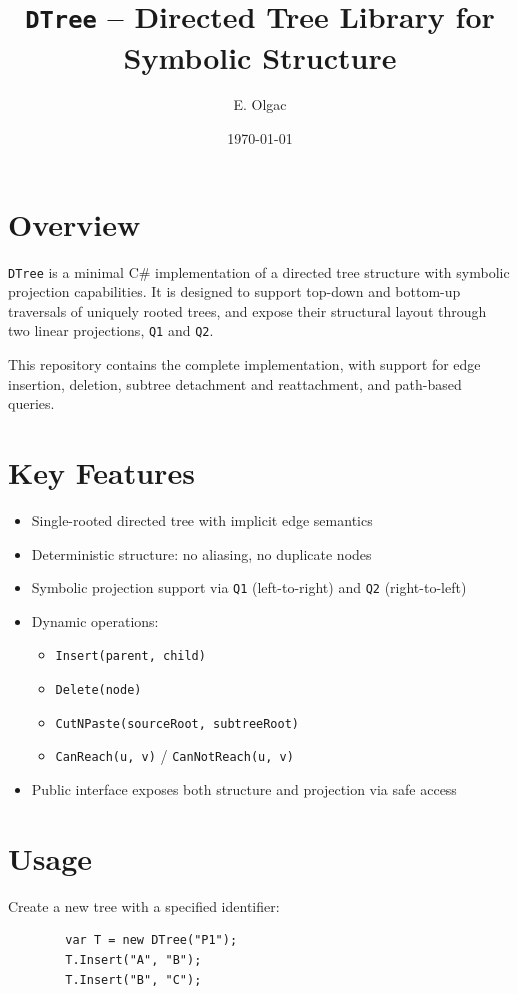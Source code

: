 \documentclass[11pt]{article}
\title{\texttt{DTree} -- Directed Tree Library for Symbolic Structure}
\author{E. Olgac}
\date{\today}
\begin{document}
	
	\maketitle
	
	\section*{Overview}
	
	\texttt{DTree} is a minimal C\# implementation of a directed tree structure with symbolic projection capabilities. It is designed to support top-down and bottom-up traversals of uniquely rooted trees, and expose their structural layout through two linear projections, \texttt{Q1} and \texttt{Q2}.
	
	This repository contains the complete implementation, with support for edge insertion, deletion, subtree detachment and reattachment, and path-based queries.
	
	\section*{Key Features}
	
	\begin{itemize}[leftmargin=2em]
		\item Single-rooted directed tree with implicit edge semantics
		\item Deterministic structure: no aliasing, no duplicate nodes
		\item Symbolic projection support via \texttt{Q1} (left-to-right) and \texttt{Q2} (right-to-left)
		\item Dynamic operations:
		\begin{itemize}
			\item \texttt{Insert(parent, child)}
			\item \texttt{Delete(node)}
			\item \texttt{CutNPaste(sourceRoot, subtreeRoot)}
			\item \texttt{CanReach(u, v)} / \texttt{CanNotReach(u, v)}
		\end{itemize}
		\item Public interface exposes both structure and projection via safe access
	\end{itemize}
	
	\section*{Usage}
	
	Create a new tree with a specified identifier:
	\begin{verbatim}
		var T = new DTree("P1");
		T.Insert("A", "B");
		T.Insert("B", "C");
	\end{verbatim}
	
\end{document}
